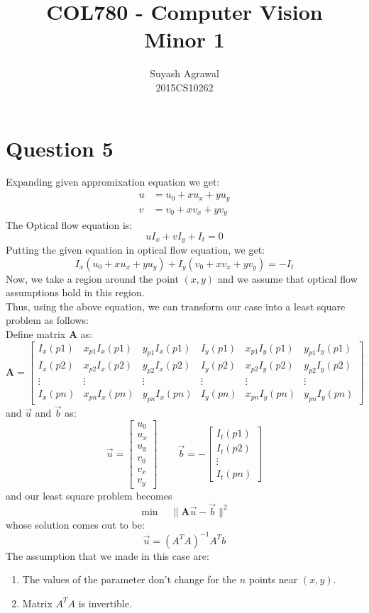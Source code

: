 \documentclass{article}
\begin{document}
\title{COL780 - Computer Vision\\Minor 1}
\author{Suyash Agrawal\\2015CS10262}

\maketitle

\section*{Question 5}
Expanding given appromixation equation we get:
\begin{align*}
u &= u_0 + xu_x + yu_y\\
v &= v_0 + xv_x + yv_y
\end{align*}
The Optical flow equation is:
$$ uI_x + vI_y + I_t = 0 $$
Putting the given equation in optical flow equation, we get:
$$ I_x(u_0 + xu_x + yu_y) + I_y(v_0 + xv_x + yv_y) = -I_t $$
Now, we take a region around the point $(x,y)$ and we assume that optical flow assumptions
hold in this region.\\
Thus, using the above equation, we can transform our case into a least square problem as follows:\\
Define matrix $\mathbf{A}$ as:
$$
\mathbf{A} = \begin{bmatrix}
  I_x(p1) & x_{p1}I_x(p1) & y_{p1}I_x(p1) & I_y(p1) & x_{p1}I_y(p1) & y_{p1}I_y(p1)\\
  I_x(p2) & x_{p2}I_x(p2) & y_{p2}I_x(p2) & I_y(p2) & x_{p2}I_y(p2) & y_{p2}I_y(p2)\\
  \vdots & \vdots & \vdots & \vdots & \vdots & \vdots \\
  I_x(pn) & x_{pn}I_x(pn) & y_{pn}I_x(pn) & I_y(pn) & x_{pn}I_y(pn) & y_{pn}I_y(pn)
\end{bmatrix}
$$
and $\vec{u}$ and $\vec{b}$ as:
$$
\vec{u} = \begin{bmatrix}
  u_0 \\
  u_x \\
  u_y \\
  v_0 \\
  v_x \\
  v_y
\end{bmatrix}
\qquad
\vec{b} = -\begin{bmatrix}
  I_t(p1) \\
  I_t(p2) \\
  \vdots \\
  I_t(pn)
\end{bmatrix}
$$
and our least square problem becomes
$$ \min \quad \lVert \mathbf{A}\vec{u} - \vec{b} \rVert^2 $$
whose solution comes out to be:
$$ \vec{u} = (A^TA)^{-1}A^Tb$$
The assumption that we made in this case are:
\begin{enumerate}
\item
The values of the parameter don't change for the $n$ points near $(x,y)$.
\item
Matrix $A^TA$ is invertible.
\end{enumerate}
\pagebreak
\end{document}
